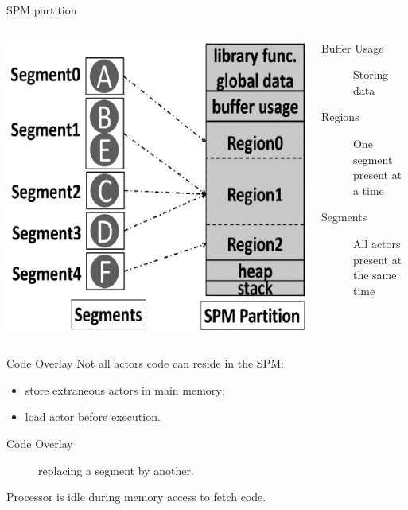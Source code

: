 \documentclass{beamer}
\begin{document}
\begin{frame}{SPM partition}
  \begin{columns}
    \begin{column}{0.55\textwidth}
      \begin{center}
        \includegraphics[height=0.75\textheight]{fig2_2}
      \end{center}
    \end{column}
    \begin{column}{0.45\textwidth}
      \begin{description}
        \item[Buffer Usage] Storing data
        \item[Regions] One segment present at a time
        \item[Segments] All actors present at the same time
      \end{description}
    \end{column}
  \end{columns}
\end{frame}

\begin{frame}{Code Overlay}
  Not all actors code can reside in the SPM\@:
  \begin{itemize}
    \item store extraneous actors in main memory;
    \item load actor before execution.
  \end{itemize}

  \begin{description}
    \item[Code Overlay] replacing a segment by another.
  \end{description}

  Processor is idle during memory access to fetch code.
\end{frame}
\end{document}
